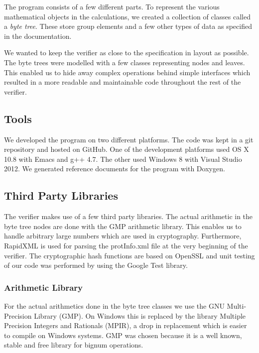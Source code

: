 The program consists of a few different parts. To represent the
various mathematical objects in the calculations, we created a
collection of classes called a \emph{byte tree}. These store group
elements and a few other types of data as specified in the
documentation.

We wanted to keep the verifier as close to the specification in layout
as possible. The byte trees were modelled with a few classes
representing nodes and leaves. This enabled us to hide away complex
operations behind simple interfaces which resulted in a more readable
and maintainable code throughout the rest of the verifier.

\subsection{Tools}

We developed the program on two different platforms. The code was kept
in a git repository and hosted on GitHub. One of the development
platforms used OS X 10.8 with Emacs and g++ 4.7. The other used
Windows 8 with Visual Studio 2012. We generated reference documents
for the program with Doxygen.

\subsection{Third Party Libraries}

The verifier makes use of a few third party libraries. The actual
arithmetic in the byte tree nodes are done with the GMP arithmetic
library. This enables us to handle arbitrary large numbers which are
used in cryptography. Furthermore, RapidXML is used for parsing the
protInfo.xml file at the very beginning of the verifier. The
cryptographic hash functions are based on OpenSSL and unit testing of
our code was performed by using the Google Test library.

\subsubsection{Arithmetic Library}

For the actual arithmetics done in the byte tree classes we use the
GNU Multi-Precision Library (GMP). On Windows this is replaced by the
library Multiple Precision Integers and Rationals (MPIR), a drop in
replacement which is easier to compile on Windows systems. GMP was
chosen because it is a well known, stable and free library for bignum
operations.


